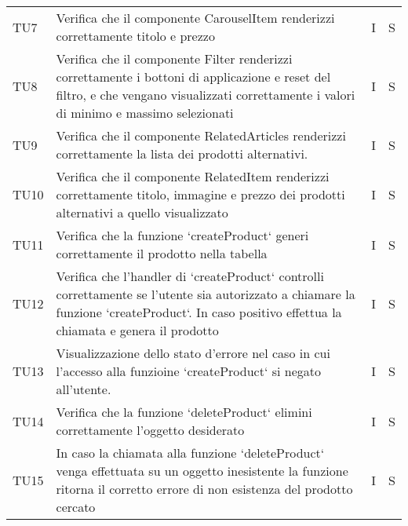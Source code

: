 \begin{center}
\begin{longtable}[!h]{p{45px} p{255px} p{35px} p{35px}}
        TU7           & Verifica che il componente CarouselItem renderizzi correttamente titolo e prezzo                                                                                                                 & I              & S              \\
        TU8           & Verifica che il componente Filter renderizzi correttamente i bottoni di applicazione e reset del filtro, e che vengano visualizzati correttamente i valori di minimo e massimo selezionati       & I              & S              \\
        TU9           & Verifica che il componente RelatedArticles renderizzi correttamente la lista dei prodotti alternativi.                                                                                           & I              & S              \\
        TU10          & Verifica che il componente RelatedItem renderizzi correttamente titolo, immagine e prezzo dei prodotti alternativi a quello visualizzato                                                         & I              & S              \\
        TU11          & Verifica che la funzione `createProduct` generi correttamente il prodotto nella tabella                                                                                                          & I              & S              \\
        TU12          & Verifica che l'handler di `createProduct` controlli correttamente se l'utente sia autorizzato a chiamare la funzione `createProduct`. In caso positivo effettua la chiamata e genera il prodotto & I              & S              \\
        TU13          & Visualizzazione dello stato d'errore nel caso in cui l'accesso alla funzioine `createProduct` si negato all'utente.                                                                              & I              & S              \\
        TU14          & Verifica che la funzione `deleteProduct` elimini correttamente l'oggetto desiderato                                                                                                              & I              & S              \\
        TU15          & In caso la chiamata alla funzione `deleteProduct` venga effettuata su un oggetto inesistente la funzione ritorna il corretto errore di non esistenza del prodotto cercato                                                      & I              & S              \\

\end{longtable}
\end{center}
